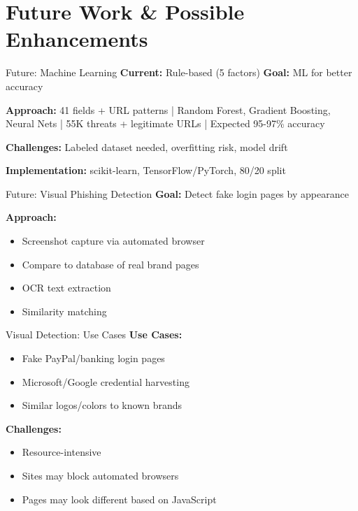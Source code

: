 \documentclass[aspectratio=169]{beamer}
\begin{document}
\section{Future Work \& Possible Enhancements}

\begin{frame}{Future: Machine Learning}
\small
\textbf{Current:} Rule-based (5 factors) \quad \textbf{Goal:} ML for better accuracy

\vspace{0.15cm}
\scriptsize
\textbf{Approach:} 41 fields + URL patterns | Random Forest, Gradient Boosting, Neural Nets | 55K threats + legitimate URLs | Expected 95-97\% accuracy

\vspace{0.15cm}
\textbf{Challenges:} Labeled dataset needed, overfitting risk, model drift

\vspace{0.15cm}
\textbf{Implementation:} scikit-learn, TensorFlow/PyTorch, 80/20 split
\end{frame}

\begin{frame}{Future: Visual Phishing Detection}
\small
\textbf{Goal:} Detect fake login pages by appearance

\vspace{0.2cm}
\textbf{Approach:}
\begin{itemize}
    \item Screenshot capture via automated browser
    \item Compare to database of real brand pages
    \item OCR text extraction
    \item Similarity matching
\end{itemize}
\end{frame}

\begin{frame}{Visual Detection: Use Cases}
\small
\textbf{Use Cases:}
\begin{itemize}
    \item Fake PayPal/banking login pages
    \item Microsoft/Google credential harvesting
    \item Similar logos/colors to known brands
\end{itemize}

\vspace{0.2cm}
\textbf{Challenges:}
\begin{itemize}
    \item Resource-intensive
    \item Sites may block automated browsers
    \item Pages may look different based on JavaScript
\end{itemize}
\end{frame}
\end{document}
